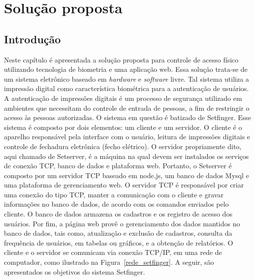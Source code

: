 \chapter{Solução proposta\label{cap:desenvolvimento}}

\section{Introdução}

Neste capítulo é apresentada a solução proposta para controle de acesso físico utilizando tecnologia de biometria e uma aplicação web. Essa solução trata-se de um sistema eletrônico baseado em \textit{hardware} e \textit{software} livre. Tal sistema utiliza a impressão digital como característica biométrica para a autenticação de usuários. A autenticação de impressões digitais é um processo de segurança utilizado em ambientes que necessitam do controle de entrada de pessoas, a fim de restringir o acesso às pessoas autorizadas. O sistema em questão é batizado de Setfinger. Esse sistema é composto por dois elementos: um cliente e um servidor. O cliente é o aparelho responsável pela interface com o usuário, leitura de impressões digitais e controle de fechadura eletrônica (fecho elétrico). O servidor propriamente dito, aqui chamado de Setserver, é a máquina na qual devem ser instalados os serviços de conexão TCP, banco de dados e plataforma web. Portanto, o Setserver é composto por um servidor TCP baseado em node.js, um banco de dados Mysql e uma plataforma de gerenciamento web. O servidor TCP é responsável por criar uma conexão do tipo TCP, manter a comunicação com o cliente e gravar informações no banco de dados, de acordo com os comandos enviados pelo cliente. O banco de dados armazena os cadastros e os registro de acesso dos usuários. Por fim, a página web provê o gerenciamento dos dados mantidos no banco de dados, tais como, atualização e exclusão de cadastros, consulta da frequência de usuários, em tabelas ou gráficos, e a obtenção de relatórios. O cliente e o servidor se comunicam via conexão TCP/IP, em uma rede de computador, como ilustrado na Figura~\ref{rede_setfinger}. A seguir, são apresentados os objetivos do sistema Setfinger.

